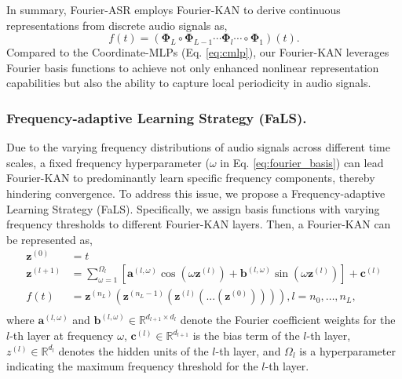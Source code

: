\documentclass[letterpaper]{article} %
\begin{document}
In summary, Fourier-ASR employs Fourier-KAN to derive continuous representations from discrete audio signals as,
\begin{equation}
    f({t})=(\mathbf{\Phi}_L \circ \mathbf{\Phi}_{L-1} \cdots \mathbf{\Phi}_{l}  \cdots \circ \mathbf{\Phi}_{1})({t}).
\end{equation} Compared to the Coordinate-MLPs (Eq. \ref{eq:cmlp}), our Fourier-KAN leverages Fourier basis functions to achieve not only enhanced nonlinear representation capabilities but also the ability to capture local periodicity in audio signals.



\subsubsection{Frequency-adaptive Learning Strategy (FaLS).}
Due to the varying frequency distributions of audio signals across different time scales, a fixed frequency hyperparameter (\(\omega\) in Eq. \ref{eq:fourier_basis}) can lead Fourier-KAN to predominantly learn specific frequency components, thereby hindering convergence. To address this issue, we propose a Frequency-adaptive Learning Strategy (FaLS). Specifically, we assign basis functions with varying frequency thresholds to different Fourier-KAN layers. Then, a Fourier-KAN can be represented as,
\begin{equation*}
\begin{aligned}
    \mathbf{z}^{(0)} & = {t} \\
    \mathbf{z}^{(l+1)} &= \sum_{\omega=1}^{\Omega_l} \left[ \mathbf{a}^{(l,\omega)}\cos(\omega \mathbf{z}^{(l)}) + \mathbf{b}^{(l,\omega)}\sin(\omega \mathbf{z}^{(l)})\right] + \mathbf{c}^{(l)} \\
    f({t}) & = \mathbf{z}^{(n_L)}\left(\mathbf{z}^{(n_L-1)}\left(\mathbf{z}^{(l)}\left(...(\mathbf{z}^{(0)})\right)\right)\right), l=n_0, \ldots, n_L, \\
\end{aligned}
\end{equation*} where \(\mathbf{a}^{(l, \omega)}\) and \(\mathbf{b}^{(l, \omega)} \in \mathbb{R}^{d_{l+1} \times d_l}\) denote the Fourier coefficient weights for the \(l\)-th layer at frequency \(\omega\), \(\mathbf{c}^{(l)} \in \mathbb{R}^{d_{l+1}}\) is the bias term of the $l$-th layer, \(z^{(l)} \in \mathbb{R}^{d_l}\) denotes the hidden units of the \(l\)-th layer, and \(\Omega_l\) is a hyperparameter indicating the maximum frequency threshold for the \(l\)-th layer.
\end{document}
